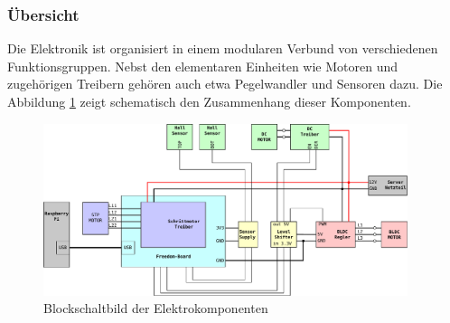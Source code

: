 \subsubsection{Übersicht}
Die Elektronik ist organisiert in einem modularen Verbund von verschiedenen
Funktionsgruppen. Nebst den elementaren Einheiten wie Motoren und zugehörigen
Treibern gehören auch etwa Pegelwandler und Sensoren dazu. Die Abbildung
\ref{fig:et-block} zeigt schematisch den Zusammenhang dieser Komponenten.


\begin{figure}[h!]
	\centering	\includegraphics[width=0.95\textwidth]{../../fig/blockdiagram.pdf}
	\caption{Blockschaltbild der Elektrokomponenten}
	\label{fig:et-block}
\end{figure}
